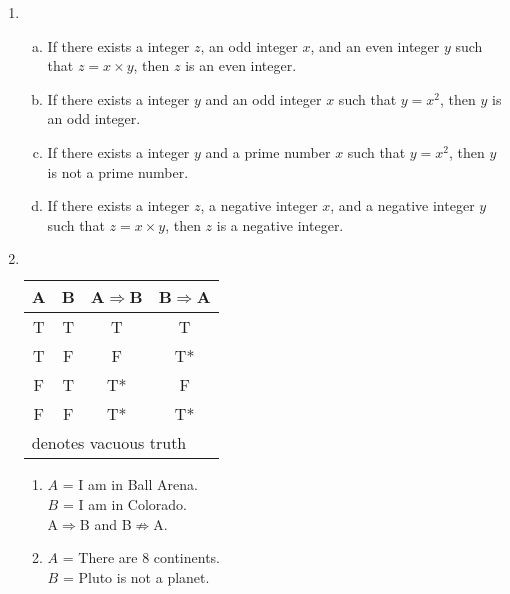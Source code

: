 \documentclass{article}
\begin{document}
\begin{enumerate}[label=(4.\arabic*),start=1]
    \item
        \begin{enumerate}[(a)]
            \item If there exists a integer $z$, an odd integer $x$, and an even integer $y$ such that $z=x \times y$, then $z$ is an even integer. 
            \item If there exists a integer $y$ and an odd integer $x$ such that $y={x^2}$, then $y$ is an odd integer.
            \item If there exists a integer $y$ and a prime number $x$ such that $y={x^2}$, then $y$ is not a prime number.
            \item If there exists a integer $z$, a negative integer $x$, and a negative integer $y$ such that $z=x\times y$, then $z$ is a negative integer.
        \end{enumerate}
    \addtocounter{enumi}{1}
    \item $ $
        \begin{center}
          \begin{tabular}{c|c||c||c}
            \textbf{A} & \textbf{B} & \textbf{A$\Rightarrow$B} & \textbf{B$\Rightarrow$A}\\
            \hline
            T & T & T & T \\\hline
            T & F & F & \hspace{2mm}T* \\\hline
            F & T & \hspace{2mm}T* & F\\\hline
            F & F & \hspace{2mm}T* & \hspace{2mm}T* \\\hline
            \multicolumn{4}{l}{\footnotesize * denotes vacuous truth}
          \end{tabular}
        \end{center}
        \begin{enumerate}[label=(Condition \arabic*.),start=1]
            \item $A$ = I am in Ball Arena. \\
                  $B$ = I am in Colorado. \\
                  A$\Rightarrow$B and B$\nRightarrow$A.
            \item $A$ = There are 8 continents. \\
                  $B$ = Pluto is not a planet. \\

\end{enumerate}
\end{enumerate}
\end{document}
